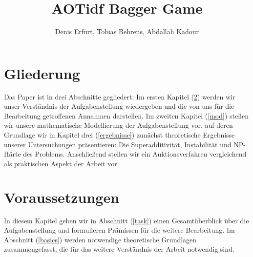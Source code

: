 \documentclass[sigconf]{acmart}
\theoremstyle{break}
\begin{document}
\title{AOTidf Bagger Game}
\author{Denis Erfurt, Tobias Behrens, Abdallah Kadour}

\begin{abstract}
  \noindent
\end{abstract}


\maketitle

\section{Gliederung}
Das Paper ist in drei Abschnitte gegliedert: Im ersten Kapitel (\ref{vorraus}) werden wir unser Verständnis der Aufgabenstellung wiedergeben und die von uns für die Bearbeitung getroffenen Annahmen darstellen. Im zweiten Kapitel (\ref{mod}) stellen wir unsere mathematische Modellierung der Aufgabenstellung vor, auf deren Grundlage wir in Kapitel drei (\ref{ergebnisse}) zunächst theoretische Ergebnisse unserer Untersuchungen präsentieren: Die Superadditivität, Instabilität und NP-Härte des Problems. Anschließend stellen wir ein Auktionsverfahren vergleichend als praktischen Aspekt der Arbeit vor. 

\section{Voraussetzungen}
\label{vorraus}
In diesem Kapitel geben wir in Abschnitt (\ref{task}) einen Gesamtüberblick über die Aufgabenstellung und formulieren Prämissen für die weitere Bearbeitung. Im Abschnitt (\ref{basics}) werden notwendige theoretische Grundlagen zusammengefasst, die für das weitere Verständnis der Arbeit notwendig sind.

\end{document}
